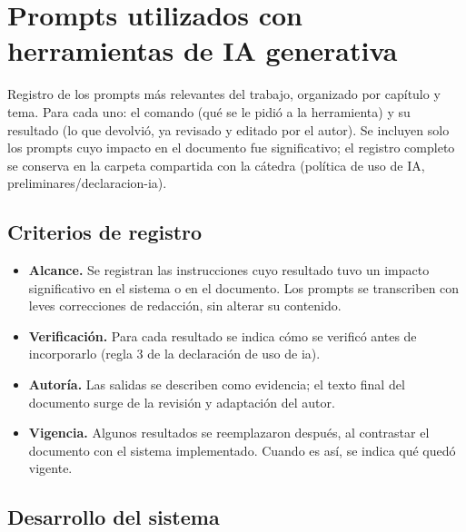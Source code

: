
\chapter{Prompts utilizados con herramientas de IA generativa}\label{apx:prompts}

\begin{guia}
Registro de los prompts más relevantes del trabajo, organizado por
capítulo y tema. Para cada uno: el comando \instruccionIA (qué se le pidió
a la herramienta) y su resultado \respuestaIA (lo que devolvió, ya
revisado y editado por el autor). Se incluyen solo los prompts cuyo
impacto en el documento fue significativo; el registro completo se
conserva en la carpeta compartida con la cátedra (política de uso de IA,
preliminares/declaracion-ia).
\end{guia}

\section{Criterios de registro}

\begin{itemize}
    \item \textbf{Alcance.} Se registran las instrucciones cuyo resultado
          tuvo un impacto significativo en el sistema o en el documento.
          Los prompts se transcriben con leves correcciones de redacción,
          sin alterar su contenido.
    \item \textbf{Verificación.} Para cada resultado se indica cómo se
          verificó antes de incorporarlo (regla 3 de la declaración de
          uso de \gls{ia}).
    \item \textbf{Autoría.} Las salidas se describen como evidencia; el
          texto final del documento surge de la revisión y adaptación del
          autor.
    \item \textbf{Vigencia.} Algunos resultados se reemplazaron después,
          al contrastar el documento con el sistema implementado. Cuando
          es así, se indica qué quedó vigente.
\end{itemize}

\section{Desarrollo del sistema}

